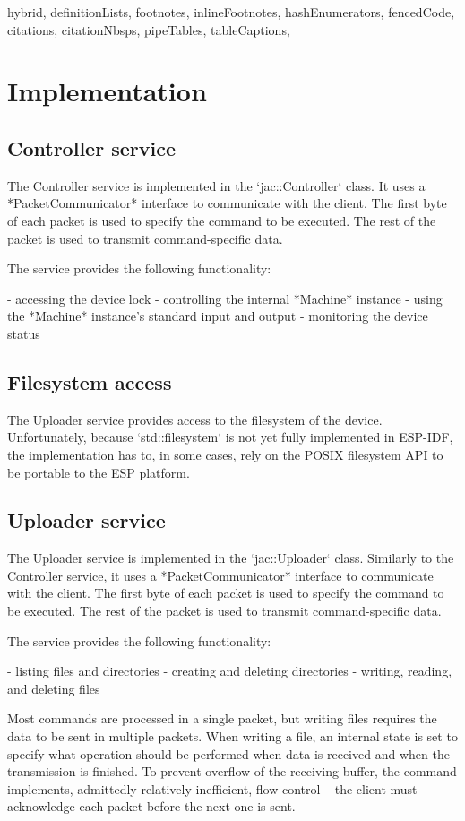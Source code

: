 \documentclass[
  digital,
  oneside,
  nosansbold,
  nocolorbold,
  lof,
  lot
]{fithesis4}
\begin{document}
\begin{markdown*}{%
  hybrid,
  definitionLists,
  footnotes,
  inlineFootnotes,
  hashEnumerators,
  fencedCode,
  citations,
  citationNbsps,
  pipeTables,
  tableCaptions,
}
\section{Implementation}

\subsection{Controller service}

The Controller service is implemented in the `jac::Controller` class. It uses a *PacketCommunicator* interface to communicate with the client. The first byte of each packet is used to specify the command to be executed. The rest of the packet is used to transmit command-specific data.

The service provides the following functionality:

  - accessing the device lock
  - controlling the internal *Machine* instance
  - using the *Machine* instance's standard input and output
  - monitoring the device status

\subsection{Filesystem access}

The Uploader service provides access to the filesystem of the device. Unfortunately, because `std::filesystem` is not yet fully implemented in ESP-IDF, the implementation has to, in some cases, rely on the POSIX filesystem API to be portable to the ESP platform.

\subsection{Uploader service}

The Uploader service is implemented in the `jac::Uploader` class. Similarly to the Controller service, it uses a *PacketCommunicator* interface to communicate with the client. The first byte of each packet is used to specify the command to be executed. The rest of the packet is used to transmit command-specific data.

The service provides the following functionality:

  - listing files and directories
  - creating and deleting directories
  - writing, reading, and deleting files

Most commands are processed in a single packet, but writing files requires the data to be sent in multiple packets. When writing a file, an internal state is set to specify what operation should be performed when data is received and when the transmission is finished. To prevent overflow of the receiving buffer, the command implements, admittedly relatively inefficient, flow control -- the client must acknowledge each packet before the next one is sent.


\end{markdown*}
\end{document}

